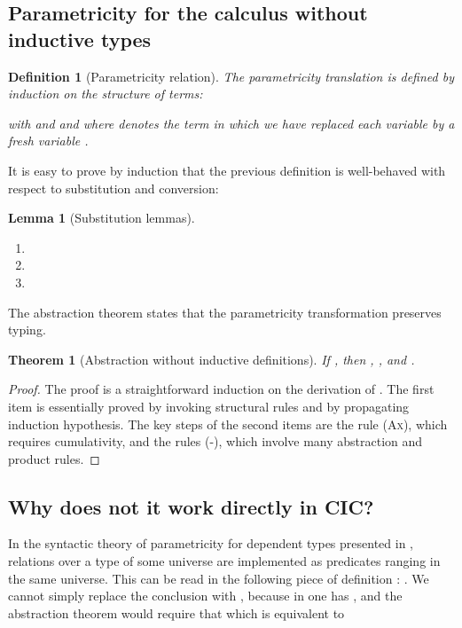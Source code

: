 \documentclass[a4paper,USenglish]{lipics}
\newtheorem{thm}{Theorem}
\newtheorem{dfn}{Definition}
\newtheorem{lem}{Lemma}
\def\cic{\textsf{CIC}\xspace}
\begin{document}
\subsection{Parametricity for the calculus without inductive types}
\setcounter{equation}{0} 

\begin{dfn}[\label{Parametricity}Parametricity relation]
The parametricity translation  is defined by induction on the
structure of terms:

with  and 
and where  denotes the term  in which we have replaced each variable
 by a fresh variable .
\end{dfn}

It is easy to prove by induction that the previous definition is
well-behaved with respect to substitution and conversion:

\begin{lem}[Substitution lemmas]\label{substLemma}
\begin{enumerate}
\item 
\item 
\item 
\end{enumerate}
\end{lem}

The abstraction theorem states that the parametricity transformation
preserves typing.

\begin{thm}[\label{Abstraction}Abstraction without inductive definitions]
If , then , , and
    .
\end{thm}

\begin{proof}
  The proof is a straightforward
  induction
  on the derivation of . The first item is essentially
  proved by invoking structural rules and by propagating induction hypothesis.
  The key steps of the second items are the rule (\textsc{Ax}), which requires cumulativity, and
  the rules (\textsc{}-\textsc{}), which involve
  many abstraction and product rules.
\end{proof}


\subsection{\label{WhyDoesNotWork}Why does not it work directly in \cic ?}

In the syntactic theory of parametricity for dependent types presented in
\cite{DBLP:conf/icfp/BernardyJP10}, relations over a type of some universe
are implemented as predicates ranging in the same universe. This can be read
in the following piece of definition : . We cannot simply replace the conclusion with , because in
 one has , and the abstraction theorem
would require that 
which is equivalent to
 
\end{document}
